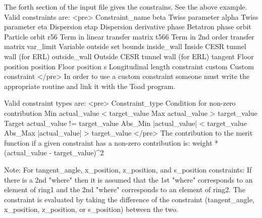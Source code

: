 The forth section of the input file gives the constrains. See the above
example. Valid constraints are:
<pre>
  Constraint_name 
    beta           Twiss parameter
    alpha          Twiss parameter
    eta            Dispersion
    etap           Dispersion derivative
    phase          Betatron phase
    orbit          Particle orbit
    r56            Term in linear transfer matrix
    t566           Term in 2nd order transfer matrix
    var_limit      Variable outside set bounds
    inside_wall    Inside CESR tunnel wall (for ERL)
    outside_wall   Outside CESR tunnel wall (for ERL)
    tangent        Floor position
    position       Floor position 
    s              Longitudinal length constraint
    custom         Custom constraint
</pre>
In order to use a custom constraint someone must write the appropriate routine
and link it with the Toad program.

Valid constraint types are:
<pre>
  Constraint_type  Condition for non-zero contribution
    Min            actual_value < target_value
    Max            actual_value > target_value
    Target         actual_value != target_value
    Abs_Min        |actual_value| < target_value
    Abs_Max        |actual_value| > target_value
</pre>
The contribution to the merit function if a given constraint has a non-zero
contribution is: weight * (actual_value - target_value)^2

Note: For tangent_angle, x_position, z_position, and s_position constraints: If
there is a 2nd "where" then it is assumed that the 1st "where" corresponds to
an element of ring1 and the 2nd "where" corresponds to an element of ring2.
The constraint is evaluated by taking the difference of the constraint
(tangent_angle, x_position, z_position, or s_position) between the two.
